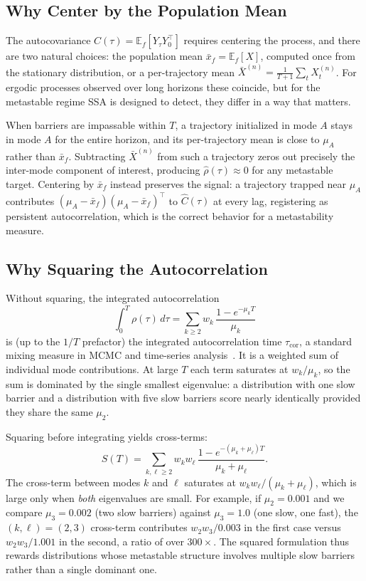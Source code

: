 \documentclass{article}
\newcommand{\E}{\mathbb{E}}
\begin{document}
\subsection{Why Center by the Population Mean}
\label{app:centering}

The autocovariance $C(\tau) = \E_f[Y_\tau Y_0^\top]$ requires centering the
process, and there are two natural choices: the population mean
$\bar x_f = \E_f[X]$, computed once from the stationary distribution, or a
per-trajectory mean $\bar{X}^{(n)} = \frac{1}{T+1}\sum_t X_t^{(n)}$. For
ergodic processes observed over long horizons these coincide, but for the
metastable regime SSA is designed to detect, they differ in a way that
matters.

When barriers are impassable within $T$, a trajectory initialized in mode
$A$ stays in mode $A$ for the entire horizon, and its per-trajectory mean is
close to $\mu_A$ rather than $\bar x_f$. Subtracting $\bar{X}^{(n)}$ from such a
trajectory zeros out precisely the inter-mode component of interest,
producing $\hat\rho(\tau) \approx 0$ for any metastable target. Centering by
$\bar x_f$ instead preserves the signal: a trajectory trapped near $\mu_A$
contributes $(\mu_A - \bar x_f)(\mu_A - \bar x_f)^\top$ to $\hat{C}(\tau)$ at every
lag, registering as persistent autocorrelation, which is the correct
behavior for a metastability measure.

\subsection{Why Squaring the Autocorrelation}
\label{app:why_squaring}

Without squaring, the integrated autocorrelation
\[
\int_0^T \rho(\tau)\,d\tau
= \sum_{k \geq 2} w_k \,\frac{1 - e^{-\mu_k T}}{\mu_k}
\]
is (up to the $1/T$ prefactor) the integrated autocorrelation time
$\tau_{\mathrm{cor}}$, a standard mixing measure in MCMC and time-series
analysis~\cite{sokal1997,geyer1992}. It is a weighted sum of individual
mode contributions. At large $T$ each term saturates at $w_k / \mu_k$, so
the sum is dominated by the single smallest eigenvalue: a distribution
with one slow barrier and a distribution with five slow barriers score
nearly identically provided they share the same $\mu_2$.

Squaring before integrating yields cross-terms:
\[
S(T) = \sum_{k,\ell \geq 2} w_k w_\ell\,
\frac{1 - e^{-(\mu_k + \mu_\ell)T}}{\mu_k + \mu_\ell}.
\]
The cross-term between modes $k$ and $\ell$ saturates at
$w_k w_\ell / (\mu_k + \mu_\ell)$, which is large only when
\emph{both} eigenvalues are small. For example, if $\mu_2 = 0.001$
and we compare $\mu_3 = 0.002$ (two slow barriers) against
$\mu_3 = 1.0$ (one slow, one fast), the $(k,\ell) = (2,3)$
cross-term contributes $w_2 w_3 / 0.003$ in the first case versus
$w_2 w_3 / 1.001$ in the second, a ratio of over $300\times$.
The squared formulation thus rewards distributions whose metastable
structure involves multiple slow barriers rather than a single
dominant one.
\end{document}
